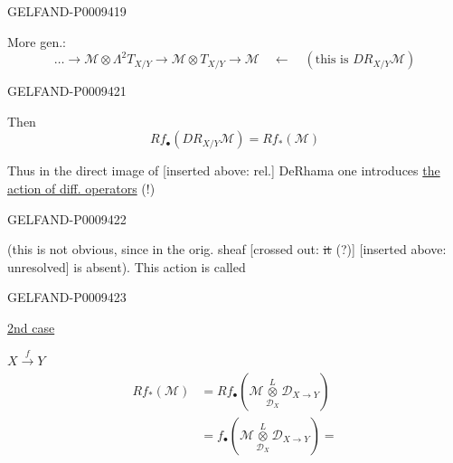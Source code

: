 \begin{GelfandAdjacentEvidence}{GELFAND-P000941}{9}


More gen.: 
\begin{equation*}
 \ldots\longrightarrow\mathcal M\otimes\Lambda^2T_{X/Y}
 \longrightarrow\mathcal M\otimes T_{X/Y}\longrightarrow\mathcal M
 \quad\leftarrow\quad(\text{this is }DR_{X/Y}\mathcal M)
 \tag{12}
\end{equation*}
\end{GelfandAdjacentEvidence}


\begin{GelfandAdjacentEvidence}{GELFAND-P000942}{1}

Then
\begin{equation*}
 Rf_\bullet(DR_{X/Y}\mathcal M)=Rf_*(\mathcal M)
 \tag{13}
\end{equation*}

Thus in the direct image of [inserted above: rel.] DeRhama one introduces \underline{the action of diff. operators} (!)
\end{GelfandAdjacentEvidence}
\begin{GelfandAdjacentEvidence}{GELFAND-P000942}{2}


(this is not obvious, since in the orig. sheaf [crossed out: \sout{it} (?)] [inserted above: unresolved] is absent). This action is called
\end{GelfandAdjacentEvidence}
\begin{GelfandAdjacentEvidence}{GELFAND-P000942}{3}



\underline{2nd case}

$X\overset f\longrightarrow Y$\qquad{}
\begin{equation*}
 \begin{aligned}
 Rf_*(\mathcal M)&=Rf_\bullet
 \left(\mathcal M\mathbin{\underset{\mathcal D_X}{\overset L\otimes}}\mathcal D_{X\to Y}\right)\\
 &=f_\bullet
 \left(\mathcal M\mathbin{\underset{\mathcal D_X}{\overset L\otimes}}\mathcal D_{X\to Y}\right)=
 \end{aligned}
 \tag{14}
\end{equation*}
\end{GelfandAdjacentEvidence}
